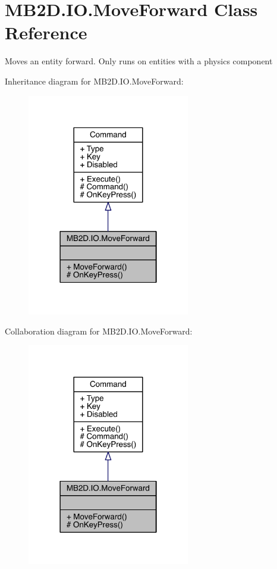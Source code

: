 \hypertarget{class_m_b2_d_1_1_i_o_1_1_move_forward}{}\section{M\+B2\+D.\+I\+O.\+Move\+Forward Class Reference}
\label{class_m_b2_d_1_1_i_o_1_1_move_forward}


Moves an entity forward. Only runs on entities with a physics component  




Inheritance diagram for M\+B2\+D.\+I\+O.\+Move\+Forward\+:
\nopagebreak
\begin{figure}[H]
\begin{center}
\leavevmode
\includegraphics[width=201pt]{class_m_b2_d_1_1_i_o_1_1_move_forward__inherit__graph}
\end{center}
\end{figure}


Collaboration diagram for M\+B2\+D.\+I\+O.\+Move\+Forward\+:
\nopagebreak
\begin{figure}[H]
\begin{center}
\leavevmode
\includegraphics[width=201pt]{class_m_b2_d_1_1_i_o_1_1_move_forward__coll__graph}
\end{center}
\end{figure}
